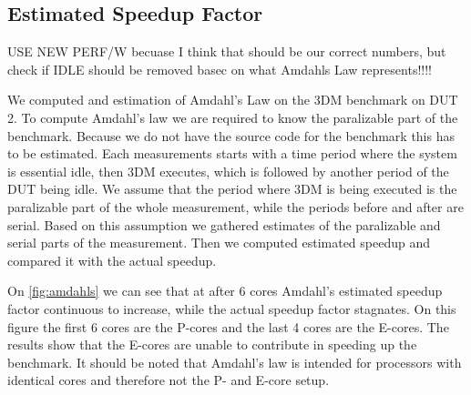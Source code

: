 \subsection{Estimated Speedup Factor}

USE NEW PERF/W becuase I think that should be our correct numbers, but check if IDLE should be removed basec on what Amdahls Law represents!!!!



We computed and estimation of Amdahl's Law on the 3DM benchmark on DUT 2. To compute Amdahl's law we are required to know the paralizable part of the benchmark. Because we do not have the source code for the benchmark this has to be estimated. Each measurements starts with a time period where the system is essential idle, then 3DM executes, which is followed by another period of the DUT being idle. We assume that the period where 3DM is being executed is the paralizable part of the whole measurement, while the periods before and after are serial. Based on this assumption we gathered estimates of the paralizable and serial parts of the measurement. Then we computed estimated speedup and compared it with the actual speedup.



On \cref{fig:amdahls} we can see that at after 6 cores Amdahl's estimated speedup factor continuous to increase, while the actual speedup factor stagnates. On this figure the first 6 cores are the P-cores and the last 4 cores are the E-cores. The results show that the E-cores are unable to contribute in speeding up the benchmark. It should be noted that Amdahl's law is intended for processors with identical cores and therefore not the P- and E-core setup. %

%
%








%
%

